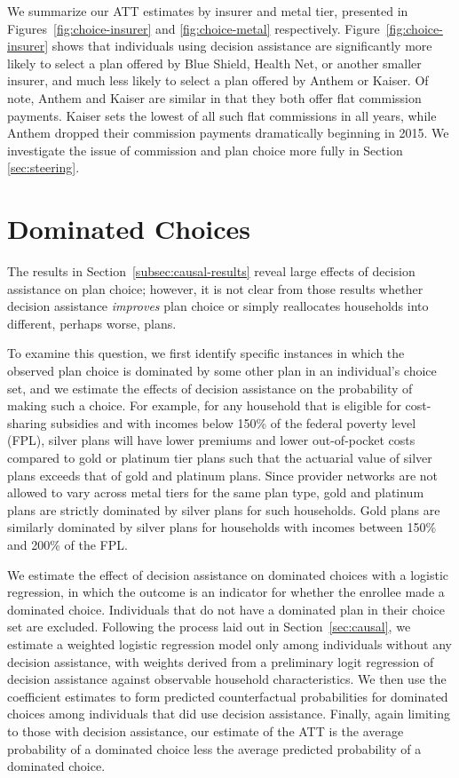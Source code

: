 \documentclass[12pt]{article}
\begin{document}
We summarize our ATT estimates by insurer and metal tier, presented in Figures~\ref{fig:choice-insurer} and \ref{fig:choice-metal} respectively. Figure~\ref{fig:choice-insurer} shows that individuals using decision assistance are significantly more likely to select a plan offered by Blue Shield, Health Net, or another smaller insurer, and much less likely to select a plan offered by Anthem or Kaiser. Of note, Anthem and Kaiser are similar in that they both offer flat commission payments. Kaiser sets the lowest of all such flat commissions in all years, while Anthem dropped their commission payments dramatically beginning in 2015. We investigate the issue of commission and plan choice more fully in Section \ref{sec:steering}.


\section{Dominated Choices}
\label{sec:dominated}
The results in Section~\ref{subsec:causal-results} reveal large effects of decision assistance on plan choice; however, it is not clear from those results whether decision assistance \textit{improves} plan choice or simply reallocates households into different, perhaps worse, plans. 

To examine this question, we first identify specific instances in which the observed plan choice is dominated by some other plan in an individual's choice set, and we estimate the effects of decision assistance on the probability of making such a choice. For example, for any household that is eligible for cost-sharing subsidies and with incomes below 150\% of the federal poverty level (FPL), silver plans will have lower premiums and lower out-of-pocket costs compared to gold or platinum tier plans such that the actuarial value of silver plans exceeds that of gold and platinum plans. Since provider networks are not allowed to vary across metal tiers for the same plan type, gold and platinum plans are strictly dominated by silver plans for such households. Gold plans are similarly dominated by silver plans for households with incomes between 150\% and 200\% of the FPL. 

We estimate the effect of decision assistance on dominated choices with a logistic regression, in which the outcome is an indicator for whether the enrollee made a dominated choice. Individuals that do not have a dominated plan in their choice set are excluded. Following the process laid out in Section~\ref{sec:causal}, we estimate a weighted logistic regression model only among individuals without any decision assistance, with weights derived from a preliminary logit regression of decision assistance against observable household characteristics. We then use the coefficient estimates to form predicted counterfactual probabilities for dominated choices among individuals that did use decision assistance. Finally, again limiting to those with decision assistance, our estimate of the ATT is the average probability of a dominated choice less the average predicted probability of a dominated choice.
\end{document}
